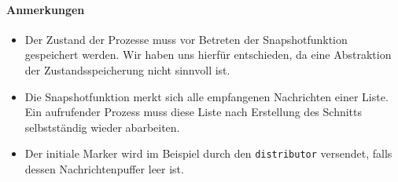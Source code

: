 \documentclass[a4paper,
12pt,
BCOR12mm,
]{scrartcl}
\theoremstyle{break}
\begin{document}
\paragraph{Anmerkungen}
\begin{itemize}
  \item Der Zustand der Prozesse muss vor Betreten der Snapshotfunktion
    gespeichert werden. Wir haben uns hierfür entschieden, da eine Abstraktion der
    Zustandsspeicherung nicht sinnvoll ist.
  \item Die Snapshotfunktion merkt sich alle empfangenen Nachrichten einer Liste. Ein
    aufrufender Prozess muss diese Liste nach Erstellung des Schnitts selbstständig wieder
    abarbeiten. 
  \item Der initiale Marker wird im Beispiel durch den \verb|distributor| versendet, falls
    dessen Nachrichtenpuffer leer ist.
\end{itemize}
\end{document}
